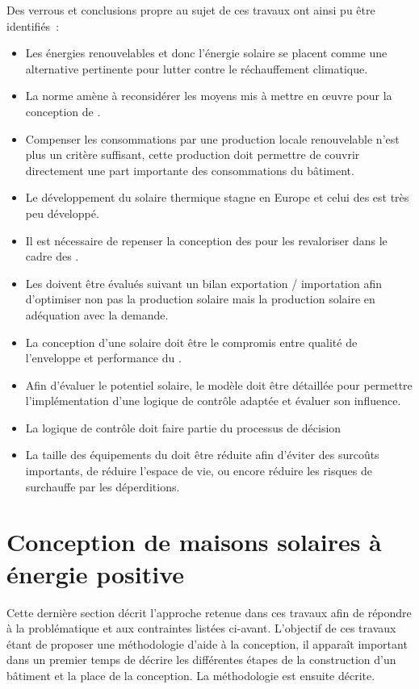 Des verrous et conclusions propre au sujet de ces travaux ont ainsi pu être identifiés~:
\begin{itemize}
  \item Les énergies renouvelables et donc l’énergie solaire se placent comme une
        alternative pertinente pour lutter contre le réchauffement climatique.
  \item La norme  amène à reconsidérer les moyens mis à mettre
        en œuvre pour la conception de .
  \item Compenser les consommations par une production locale renouvelable n’est plus un critère
        suffisant, cette production doit permettre de couvrir directement une part
        importante des consommations du bâtiment.
  \item Le développement du solaire thermique stagne en Europe et celui des 
        est très peu développé.
  \item Il est nécessaire de repenser la conception des  pour les revaloriser
        dans le cadre des .
  \item Les  doivent être évalués suivant un bilan exportation / importation
        afin d’optimiser non pas la production solaire mais la production solaire
        en adéquation avec la demande.
  \item La conception d’une  solaire doit être le compromis entre qualité
        de l’enveloppe et performance du .
  \item Afin d’évaluer le potentiel solaire, le modèle doit être détaillée pour
        permettre l’implémentation d’une logique de contrôle adaptée et évaluer
        son influence.
  \item La logique de contrôle doit faire partie du processus de décision
  \item La taille des équipements du  doit être réduite afin d’éviter des
        surcoûts importants, de réduire l’espace de vie, ou encore réduire les risques
        de surchauffe par les déperditions.
\end{itemize}




\section{Conception de maisons solaires à énergie positive} %
\label{sec:conception_de_maisons_solaires_a_energie_positive}
Cette dernière section décrit l’approche retenue dans ces travaux afin de répondre
à la problématique et aux contraintes listées ci-avant. L’objectif de ces travaux
étant de proposer une méthodologie d’aide à la conception, il apparaît important
dans un premier temps de décrire les différentes étapes de la construction d’un
bâtiment et la place de la conception. La méthodologie est ensuite décrite.


